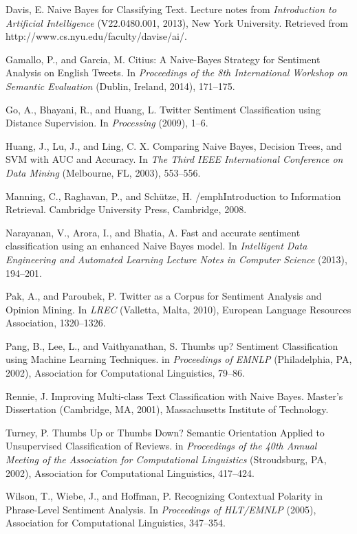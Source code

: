 \documentclass[letter,12pt]{article}
\begin{document}

\begin{thebibliography}{9}

  Davis, E. Naive Bayes for Classifying Text. Lecture notes from
  \emph{Introduction to Artificial Intelligence} (V22.0480.001, 2013), New York
  University.
  Retrieved from http://www.cs.nyu.edu/faculty/davise/ai/.

  Gamallo, P., and Garcia, M. Citius: A Naive-Bayes Strategy for Sentiment
  Analysis on English Tweets. In \emph{Proceedings of the 8th International
  Workshop on Semantic Evaluation} (Dublin, Ireland, 2014), 171--175.

  Go, A., Bhayani, R.,  and Huang, L. Twitter Sentiment Classification using
  Distance Supervision. In \emph{Processing} (2009), 1--6.

  Huang, J., Lu, J., and Ling, C. X. Comparing Naive Bayes, Decision Trees, and
  SVM with AUC and Accuracy. In \emph{The Third IEEE International Conference
  on Data Mining} (Melbourne, FL, 2003), 553--556.

  Manning, C., Raghavan, P., and Schütze, H. /emph{Introduction to Information
  Retrieval}. Cambridge University Press, Cambridge, 2008.

  Narayanan, V., Arora, I., and Bhatia, A. Fast and accurate sentiment
  classification using an enhanced Naive Bayes model. In \emph{Intelligent Data
  Engineering and Automated Learning Lecture Notes in Computer Science} (2013),
  194--201.

  Pak, A., and Paroubek, P. Twitter as a Corpus for Sentiment Analysis and
  Opinion Mining. In \emph{LREC} (Valletta, Malta, 2010), European Language
  Resources Association, 1320--1326.

  Pang, B., Lee, L., and Vaithyanathan, S.
  Thumbs up? Sentiment Classification using Machine Learning Techniques.
  in \emph{Proceedings of EMNLP} (Philadelphia, PA, 2002), Association for
  Computational Linguistics, 79--86.

  Rennie, J. Improving Multi-class Text Classification with Naive Bayes.
  Master's Dissertation (Cambridge, MA, 2001), Massachusetts Institute of
  Technology.

  Turney, P.
  Thumbs Up or Thumbs Down? Semantic Orientation Applied to
  Unsupervised Classification of Reviews.
  in \emph{Proceedings of the 40th Annual Meeting of the Association for
  Computational Linguistics} (Stroudsburg, PA, 2002), Association for
  Computational Linguistics, 417--424.

  Wilson, T., Wiebe, J., and Hoffman, P. Recognizing Contextual Polarity in
  Phrase-Level Sentiment Analysis. In \emph{Proceedings of HLT/EMNLP} (2005),
  Association for Computational Linguistics, 347--354.

\end{thebibliography}
\end{document}

